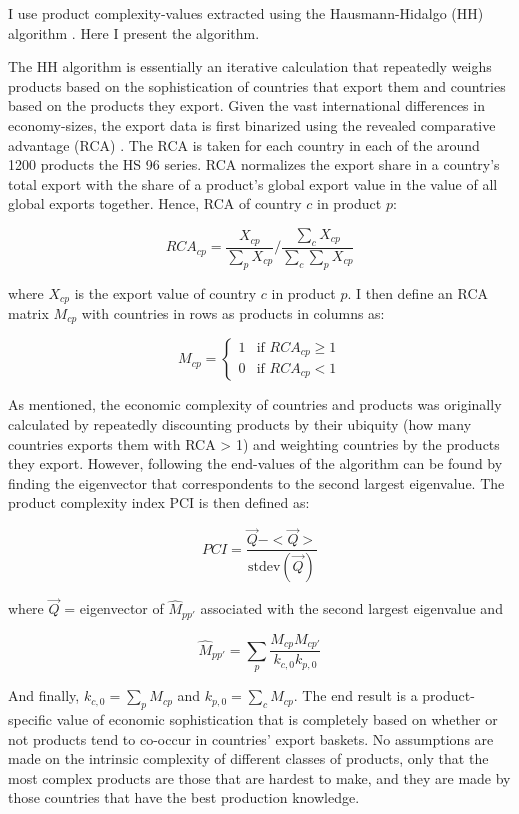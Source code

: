 \documentclass[11pt]{article}
\begin{document}
\begin{appendices}
I use product complexity-values extracted using the Hausmann-Hidalgo (HH) algorithm \citep{hidalgo_building_2009}. Here I present the algorithm. 

The HH algorithm is essentially an iterative calculation that repeatedly weighs products based on the sophistication of countries that export them and countries based on the products they export. Given the vast international differences in economy-sizes, the export data is first binarized using the revealed comparative advantage (RCA) \citep{balassa_trade_1965}. The RCA is taken for each country in each of the around 1200 products the HS 96 series. RCA normalizes the export share in a country's total export with the share of a product's global export value in the value of all global exports together. Hence, RCA of country \(c\) in product \(p\):

\[
RCA_{cp} = \frac{X_{cp}}{\sum_p X_{cp}} \bigg/ \frac{\sum_c X_{cp}}{\sum_c \sum_p X_{cp}}
\]

where \(X_{cp}\) is the export value of country \(c\) in product \(p\). I then define an RCA matrix \(M_{cp}\) with countries in rows as products in columns as:

\[
M_{cp} = \begin{cases}
1 & \text{if } RCA_{cp} \geq 1 \\
0 & \text{if } RCA_{cp} < 1
\end{cases}
\]

As mentioned, the economic complexity of countries and products was originally calculated by repeatedly discounting products by their ubiquity (how many countries exports them with RCA > 1) and weighting countries by the products they export. However, following \cite{hausmann_atlas_2013} the end-values of the algorithm can be found by finding the eigenvector that correspondents to the second largest eigenvalue. The product complexity index PCI is then defined as:

\[
  PCI = \frac{\vec{Q} - < \vec{Q} >}{\text{stdev}(\vec{Q})}
\]

 where \(\vec{Q}\) = eigenvector of \(\hat{M}_{pp'}\) associated with the second largest eigenvalue and

\[
\hat{M}_{pp'} = \sum_p \frac{M_{cp}M_{cp'}}{k_{c,0}k_{p,0}}
\]

And finally, \(k_{c,0} = \sum_p M_{cp}\) and \(k_{p,0} = \sum_c M_{cp}\). The end result is a product-specific value of economic sophistication that is completely based on whether or not products tend to co-occur in countries' export baskets. No assumptions are made on the intrinsic complexity of different classes of products, only that the most complex products are those that are hardest to make, and they are made by those countries that have the best production knowledge. 


\end{appendices}
\end{document}
